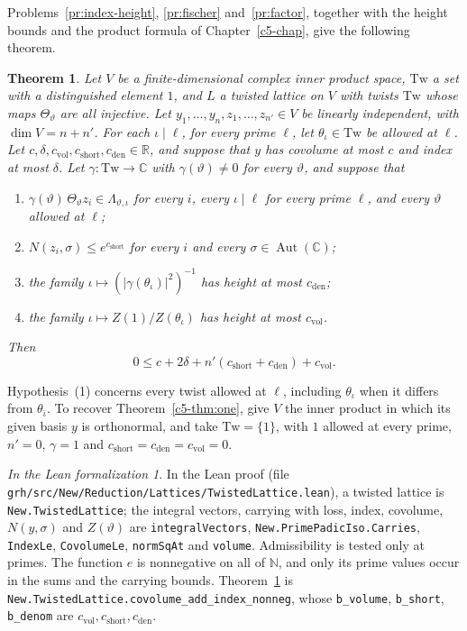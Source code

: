 \documentclass[reqno]{amsart}
\newcounter{chap}
\theoremstyle{definition}
\theoremstyle{plain}
\newtheorem{theorem}{Theorem}[section]
\theoremstyle{remark}
\newtheorem*{leanremark}{In the Lean formalization}
\newcommand{\R}{\mathbb{R}}
\newcommand{\C}{\mathbb{C}}
\newcommand{\Aut}{\operatorname{Aut}}
\newcommand{\cvol}{c_{\mathrm{vol}}}
\newcommand{\cshort}{c_{\mathrm{short}}}
\newcommand{\cden}{c_{\mathrm{den}}}
\newcommand{\tl}[1]{\texttt{#1}}
\begin{document}
Problems~\ref{pr:index-height}, \ref{pr:fischer} and~\ref{pr:factor}, together with the height bounds and the product formula of Chapter~\ref{c5-chap}, give the following theorem.

\begin{theorem}\label{thm:twist}
Let \(V\) be a finite-dimensional complex inner product space, \(\mathrm{Tw}\) a set with a distinguished element \(1\), and \(L\) a twisted lattice on \(V\) with twists \(\mathrm{Tw}\) whose maps \(\Theta_\vartheta\) are all injective.  Let \(y_1, \dots, y_n, z_1, \dots, z_{n'} \in V\) be linearly independent, with \(\dim V = n + n'\).  For each \(\iota \mid \ell\), for every prime \(\ell\), let \(\theta_\iota \in \mathrm{Tw}\) be allowed at \(\ell\).  Let \(c, \delta, \cvol, \cshort, \cden \in \R\), and suppose that \(y\) has covolume at most \(c\) and index at most \(\delta\).  Let \(\gamma\colon \mathrm{Tw} \to \C\) with \(\gamma(\vartheta) \ne 0\) for every \(\vartheta\), and suppose that
\begin{enumerate}
\item \(\gamma(\vartheta)\, \Theta_\vartheta z_i \in \Lambda_{\vartheta, \iota}\) for every \(i\), every \(\iota \mid \ell\) for every prime \(\ell\), and every \(\vartheta\) allowed at \(\ell\);
\item \(N(z_i, \sigma) \le e^{\cshort}\) for every \(i\) and every \(\sigma \in \Aut(\C)\);
\item the family \(\iota \mapsto (\lvert \gamma(\theta_\iota) \rvert^2)^{-1}\) has height at most \(\cden\);
\item the family \(\iota \mapsto Z(1)/Z(\theta_\iota)\) has height at most \(\cvol\).
\end{enumerate}
Then
\[
  0 \le c + 2\delta + n'(\cshort + \cden) + \cvol .
\]
\end{theorem}

Hypothesis~(1) concerns every twist allowed at \(\ell\), including \(\theta_\iota\) when it differs from \(\theta_{\bar\iota}\).  To recover Theorem~\ref{c5-thm:one}, give \(V\) the inner product in which its given basis \(y\) is orthonormal, and take \(\mathrm{Tw}=\{1\}\), with \(1\) allowed at every prime, \(n'=0\), \(\gamma=1\) and \(\cshort=\cden=\cvol=0\).

\begin{leanremark}
\raggedright In the Lean proof \cite{GL} (file \tl{grh/src/New/Reduction/Lattices/TwistedLattice.lean}), a twisted lattice is \tl{New.TwistedLattice}; the integral vectors, carrying with loss, index, covolume, \(N(y,\sigma)\) and \(Z(\vartheta)\) are \tl{integralVectors}, \tl{New.PrimePadicIso.Carries}, \tl{IndexLe}, \tl{CovolumeLe}, \tl{normSqAt} and \tl{volume}.  Admissibility is tested only at primes.  The function \(e\) is nonnegative on all of \(\mathbb N\), and only its prime values occur in the sums and the carrying bounds.  Theorem~\ref{thm:twist} is \tl{New.\allowbreak{}TwistedLattice.\allowbreak{}covolume\_\allowbreak{}add\_\allowbreak{}index\_\allowbreak{}nonneg}, whose \tl{b\_volume}, \tl{b\_short}, \tl{b\_denom} are \(\cvol, \cshort, \cden\).
\end{leanremark}
\end{document}
